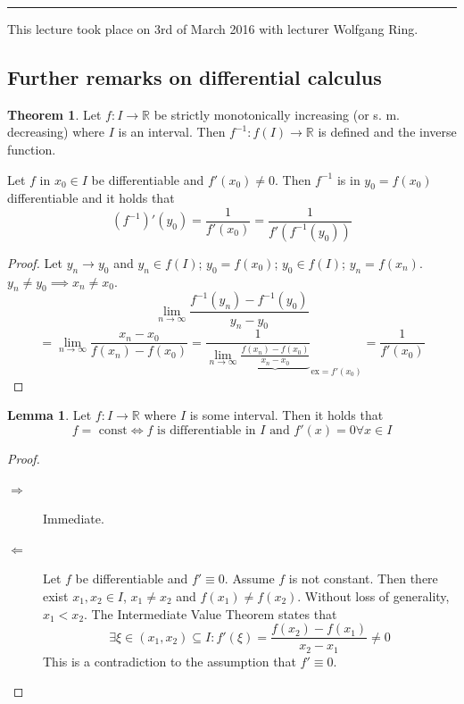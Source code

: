 \documentclass[a4paper,landscape,twocolumn]{article}
\theoremstyle{definition}
\newtheorem{theorem}{Theorem}
\newtheorem{lemma}{Lemma}
\newcommand\meta[3]{\hrule{} This #1 took place on #2 with lecturer #3.\par}
\begin{document}
\meta{lecture}{3rd of March 2016}{Wolfgang Ring}

\subsection{Further remarks on differential calculus}

\begin{theorem}
  Let $f: I \to \mathbb R$ be strictly monotonically increasing (or s. m. decreasing)
  where $I$ is an interval. Then $f^{-1}: f(I) \to \mathbb R$ is defined and the inverse function.

  Let $f$ in $x_0 \in I$ be differentiable and $f'(x_0) \neq 0$. Then $f^{-1}$ is in $y_0 = f(x_0)$
  differentiable and it holds that
  \[ (f^{-1})'(y_0) = \frac{1}{f'(x_0)} = \frac{1}{f'(f^{-1}(y_0))} \]
\end{theorem}

\begin{proof}
  Let $y_n \to y_0$ and $y_n \in f(I)$; $y_0 = f(x_0)$; $y_0 \in f(I)$; $y_n = f(x_n)$.
  $y_n \neq y_0 \implies x_n \neq x_0$.
  \[ \lim_{n\to\infty} \frac{f^{-1}(y_n) - f^{-1}(y_0)}{y_n - y_0} \]
  \[
    = \lim_{n\to\infty} \frac{x_n - x_0}{f(x_n) - f(x_0)}
    = \frac{1}{\lim_{n\to\infty} \underbrace{\frac{f(x_n) - f(x_0)}{x_n - x_0}}}_{\text{ex} = f'(x_0)} = \frac{1}{f'(x_0)}
  \]
\end{proof}

\begin{lemma}
  \label{lemma:const-diff}
  Let $f: I \to \mathbb R$ where $I$ is some interval. Then it holds that
  \[ f = \text{ const} \Leftrightarrow f \text{ is differentiable in $I$ and } f'(x) = 0 \forall x \in I \]
\end{lemma}
\begin{proof}
  \begin{description}
    \item[$\Rightarrow$]
      Immediate.
    \item[$\Leftarrow$]
      Let $f$ be differentiable and $f' \equiv 0$.
      Assume $f$ is not constant. Then there exist $x_1, x_2 \in I$, $x_1 \neq x_2$
      and $f(x_1) \neq f(x_2)$. Without loss of generality, $x_1 < x_2$.
      The Intermediate Value Theorem states that
      \[ \exists \xi \in (x_1, x_2) \subseteq I: f'(\xi) = \frac{f(x_2) - f(x_1)}{x_2 - x_1} \neq 0 \]
      This is a contradiction to the assumption that $f' \equiv 0$.
  \end{description}
\end{proof}
\end{document}
